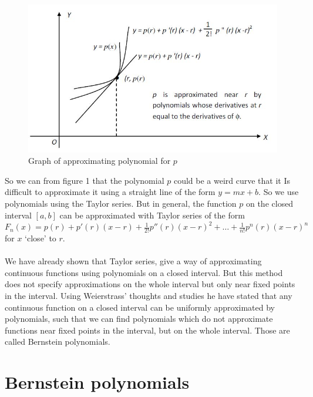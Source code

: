 \documentclass{article}
\begin{document}
\begin{figure}
\centering
\includegraphics[width=1\textwidth]{Project-weierstrass.JPG}
    \caption{Graph of approximating polynomial for $p$}
    \label{fig:1}
\end{figure}

So we can from figure 1 that the polynomial $p$ could be a weird curve that it Is difficult to approximate it using a straight line of the form $y=mx+b$.
So we use polynomials using the Taylor series.
But in general, the function $p$ on the closed interval $[a,b]$ can be approximated with Taylor series of the form $F_n(x) = p(r) + p'(r)(x - r) + \frac{1}{2!}p''(r) (x - r)^2 + \dots + \frac{1}{n!} p^n(r)(x - r)^n$ for $x$ `close' to $r$.
\paragraph{}
We have already shown that Taylor series, give a way of approximating continuous functions using polynomials on a closed interval. But this method does not specify approximations on the whole interval but only near fixed points in the interval. Using Weierstrass’ thoughts and studies he have stated that any continuous function on a closed interval can be uniformly approximated by polynomials, such that we can find polynomials which do not approximate functions near fixed points in the interval, but on the whole interval. Those are called Bernstein polynomials.
\section{Bernstein polynomials}
\end{document}
